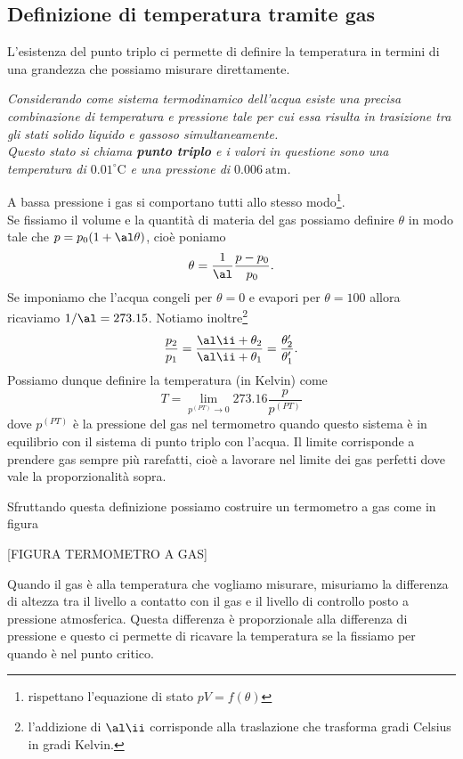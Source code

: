 \subsection{Definizione di temperatura tramite gas}
L'esistenza del punto triplo ci permette di definire la temperatura in termini di una grandezza che possiamo misurare direttamente. 
\begin{fact}
\emph{Considerando come sistema termodinamico dell'acqua esiste una precisa combinazione di temperatura e pressione tale per cui essa risulta in trasizione tra gli stati solido liquido e gassoso simultaneamente.\\
Questo stato si chiama \textbf{punto triplo} e i valori in questione sono una temperatura di $0.01 ^\circ \mathrm{C}$ e una pressione di $0.006\ \mathrm{atm}$.}
\end{fact}
\medskip

\noindent
A bassa pressione i gas si comportano tutti allo stesso modo\footnote{rispettano l'equazione di stato $pV=f(\theta)$}.\\
Se fissiamo il volume e la quantit\`a di materia del gas possiamo definire $\theta$ in modo tale che $p=p_0(1+\al\theta)$, cio\`e poniamo 
\[\theta=\frac1\al\frac{p-p_0}{p_0}.\] 
Se imponiamo che l'acqua congeli per $\theta=0$ e evapori per $\theta=100$ allora ricaviamo $1/\al=273.15$. Notiamo inoltre\footnote{l'addizione di $\al\ii$ corrisponde alla traslazione che trasforma gradi Celsius in gradi Kelvin.}
\[\frac{p_2}{p_1}=\frac{\al\ii+\theta_2}{\al\ii +\theta_1}=\frac{\theta_2'}{\theta_1'}.\]
Possiamo dunque definire la temperatura (in Kelvin) come
\[T=\lim_{p^{(PT)}\to 0}273.16 \frac{p}{p^{(PT)}}\]
dove $p^{(PT)}$ \`e la pressione del gas nel termometro quando questo sistema \`e in equilibrio con il sistema di punto triplo con l'acqua. Il limite corrisponde a prendere gas sempre pi\`u rarefatti, cio\`e a lavorare nel limite dei gas perfetti dove vale la proporzionalit\`a sopra.
\medskip

\noindent Sfruttando questa definizione possiamo costruire un termometro a gas come in figura

[FIGURA TERMOMETRO A GAS]

\noindent Quando il gas \`e alla temperatura che vogliamo misurare, misuriamo la differenza di altezza tra il livello a contatto con il gas e il livello di controllo posto a pressione atmosferica. 
Questa differenza \`e proporzionale alla differenza di pressione e questo ci permette di ricavare la temperatura se la fissiamo per quando \`e nel punto critico.




